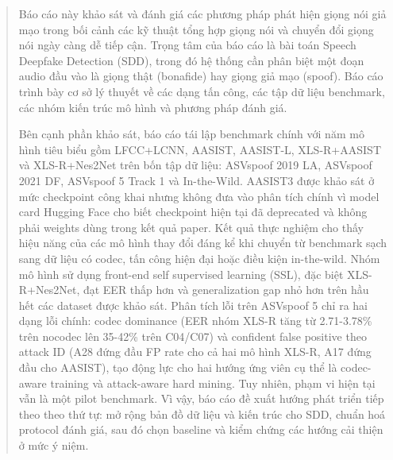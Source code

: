 ﻿\documentclass[12pt,a4paper,oneside]{book} %
\begin{document}
%


\begin{abstract}

Báo cáo này khảo sát và đánh giá các phương pháp phát hiện giọng nói giả mạo trong bối cảnh các kỹ thuật tổng hợp giọng nói và chuyển đổi giọng nói ngày càng dễ tiếp cận. Trọng tâm của báo cáo là bài toán Speech Deepfake Detection (SDD), trong đó hệ thống cần phân biệt một đoạn audio đầu vào là giọng thật (bonafide) hay giọng giả mạo (spoof). Báo cáo trình bày cơ sở lý thuyết về các dạng tấn công, các tập dữ liệu benchmark, các nhóm kiến trúc mô hình và phương pháp đánh giá.

Bên cạnh phần khảo sát, báo cáo tái lập benchmark chính với năm mô hình tiêu biểu gồm LFCC+LCNN, AASIST, AASIST-L, XLS-R+AASIST và XLS-R+Nes2Net trên bốn tập dữ liệu: ASVspoof 2019 LA, ASVspoof 2021 DF, ASVspoof 5 Track 1 và In-the-Wild. AASIST3 được khảo sát ở mức checkpoint công khai nhưng không đưa vào phân tích chính vì model card Hugging Face cho biết checkpoint hiện tại đã deprecated và không phải weights dùng trong kết quả paper. Kết quả thực nghiệm cho thấy hiệu năng của các mô hình thay đổi đáng kể khi chuyển từ benchmark sạch sang dữ liệu có codec, tấn công hiện đại hoặc điều kiện in-the-wild. Nhóm mô hình sử dụng front-end self supervised learning (SSL), đặc biệt XLS-R+Nes2Net, đạt EER thấp hơn và generalization gap nhỏ hơn trên hầu hết các dataset được khảo sát. Phân tích lỗi trên ASVspoof 5 chỉ ra hai dạng lỗi chính: codec dominance (EER nhóm XLS-R tăng từ 2.71-3.78\% trên nocodec lên 35-42\% trên C04/C07) và confident false positive theo attack ID (A28 đứng đầu FP rate cho cả hai mô hình XLS-R, A17 đứng đầu cho AASIST), tạo động lực cho hai hướng ứng viên cụ thể là codec-aware training và attack-aware hard mining. Tuy nhiên, phạm vi hiện tại vẫn là một pilot benchmark. Vì vậy, báo cáo đề xuất hướng phát triển tiếp theo theo thứ tự: mở rộng bản đồ dữ liệu và kiến trúc cho SDD, chuẩn hoá protocol đánh giá, sau đó chọn baseline và kiểm chứng các hướng cải thiện ở mức ý niệm.
\end{abstract}
 

\tableofcontents
\listoftables
\listoffigures


\mainmatter


\pagestyle{fancy}
\renewcommand{\chaptermark}[1]{\markboth{\MakeUppercase{#1}}{}}
\fancyhf{}
\fancyhead[LE,RO]{\leftmark}
\fancyhead[RE,LO]{}
\fancyfoot[LE,RO]{\thepage}
\renewcommand{\footrulewidth}{0.4pt}
\end{document}
